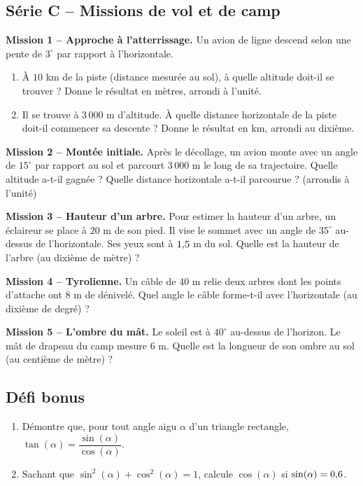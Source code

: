 \documentclass[../main.tex]{subfiles}
\begin{document}
\subsection{Série C -- Missions de vol et de camp}

\textbf{Mission 1 -- Approche à l'atterrissage.}
Un avion de ligne descend selon une pente de $3^\circ$ par rapport à l'horizontale.
\begin{enumerate}[label=\alph*)]
  \item À $10$ km de la piste (distance mesurée au sol), à quelle altitude doit-il se trouver ? Donne le résultat en mètres, arrondi à l'unité.
  \item Il se trouve à $3\,000$ m d'altitude. À quelle distance horizontale de la piste doit-il commencer sa descente ? Donne le résultat en km, arrondi au dixième.
\end{enumerate}

\textbf{Mission 2 -- Montée initiale.}
Après le décollage, un avion monte avec un angle de $15^\circ$ par rapport au sol et parcourt $3\,000$ m le long de sa trajectoire. Quelle altitude a-t-il gagnée ? Quelle distance horizontale a-t-il parcourue ? (arrondis à l'unité)

\textbf{Mission 3 -- Hauteur d'un arbre.}
Pour estimer la hauteur d'un arbre, un éclaireur se place à $20$ m de son pied. Il vise le sommet avec un angle de $35^\circ$ au-dessus de l'horizontale. Ses yeux sont à $1{,} 5$ m du sol. Quelle est la hauteur de l'arbre (au dixième de mètre) ?

\textbf{Mission 4 -- Tyrolienne.}
Un câble de $40$ m relie deux arbres dont les points d'attache ont $8$ m de dénivelé. Quel angle le câble forme-t-il avec l'horizontale (au dixième de degré) ?

\textbf{Mission 5 -- L'ombre du mât.}
Le soleil est à $40^\circ$ au-dessus de l'horizon. Le mât de drapeau du camp mesure $6$ m. Quelle est la longueur de son ombre au sol (au centième de mètre) ?

\subsection{Défi bonus}

\begin{enumerate}[label=\alph*)]
  \item Démontre que, pour tout angle aigu $\alpha$ d'un triangle rectangle, $\tan(\alpha) = \dfrac{\sin(\alpha)}{\cos(\alpha)}$.
  \item Sachant que $\sin^2(\alpha) + \cos^2(\alpha) = 1$, calcule $\cos(\alpha)$ si $\sin(\alpha) = 0{,} 6$.
\end{enumerate}
\end{document}
